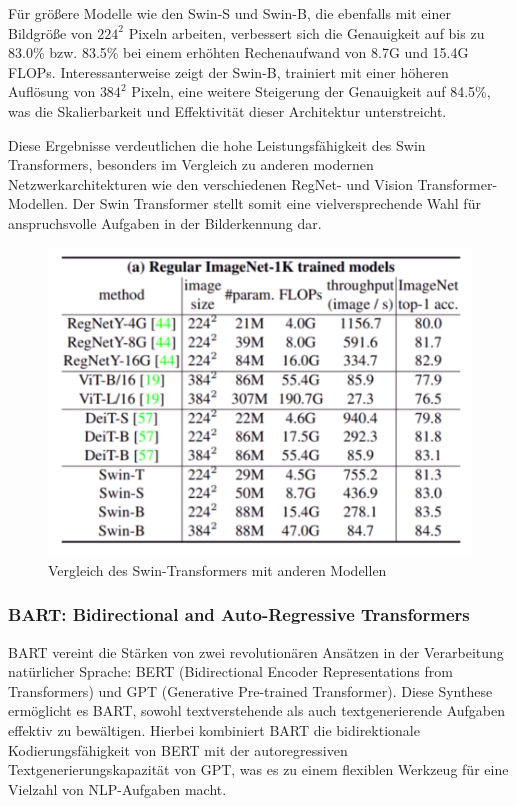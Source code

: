\documentclass[12pt,a4paper,twoside]{article}
\begin{document}
Für größere Modelle wie den Swin-S und Swin-B, die ebenfalls mit einer Bildgröße von \(224^2\) Pixeln arbeiten, verbessert sich die Genauigkeit auf bis zu 83.0\% bzw. 83.5\% bei einem erhöhten Rechenaufwand von 8.7G und 15.4G FLOPs. Interessanterweise zeigt der Swin-B, trainiert mit einer höheren Auflösung von \(384^2\) Pixeln, eine weitere Steigerung der Genauigkeit auf 84.5\%, was die Skalierbarkeit und Effektivität dieser Architektur unterstreicht.

Diese Ergebnisse verdeutlichen die hohe Leistungsfähigkeit des Swin Transformers, besonders im Vergleich zu anderen modernen Netzwerkarchitekturen wie den verschiedenen RegNet- und Vision Transformer-Modellen. Der Swin Transformer stellt somit eine vielversprechende Wahl für anspruchsvolle Aufgaben in der Bilderkennung dar.
\begin{figure}[H]
    \centering
    \includegraphics[width=0.6\linewidth]{SWIN-Transformer-Performance.png}
    \caption{Vergleich des Swin-Transformers mit anderen Modellen}
    \label{fig:enter-label}
\end{figure}

\cite{SWIN-Transformer-Paper}
\cite{SWIN-youtube}



\subsubsection{BART: Bidirectional and Auto-Regressive Transformers}

BART vereint die Stärken von zwei revolutionären Ansätzen in der Verarbeitung natürlicher Sprache: BERT (Bidirectional Encoder Representations from Transformers) und GPT (Generative Pre-trained Transformer). Diese Synthese ermöglicht es BART, sowohl textverstehende als auch textgenerierende Aufgaben effektiv zu bewältigen. Hierbei kombiniert BART die bidirektionale Kodierungsfähigkeit von BERT mit der autoregressiven Textgenerierungskapazität von GPT, was es zu einem flexiblen Werkzeug für eine Vielzahl von NLP-Aufgaben macht.
\end{document}
